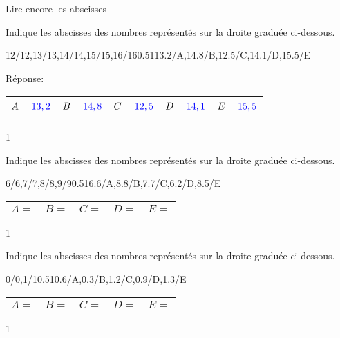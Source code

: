 \documentclass[a4paper,11pt]{report}
\begin{document}
\begin{resolu}{Lire encore les abscisses}{
Indique les abscisses des nombres représentés sur la droite graduée ci-dessous.
\vspace{-0.2cm}
\begin{center}
\begin{numberlined}{12}{16}{1}{0.2}{12/12,13/13,14/14,15/15,16/16}{0.5}{1}{13.2/A,14.8/B,12.5/C,14.1/D,15.5/E}
\end{numberlined}
\end{center}
\vspace{-0.5cm}
Réponse:
\begin{center}
\begin{tabular}{|p{2.5cm}|p{2.5cm}|p{2.5cm}|p{2.2cm}|p{2.5cm}|}\hline
& & & & \\
$A={\color{blue}13,2}$&$B={\color{blue}14,8}$&$C={\color{blue}12,5}$&$D={\color{blue}14,1}$&$E={\color{blue}15,5}$ \\
& & & & \\\hline
\end{tabular}
\end{center}
\vspace{-0.5cm}
}{1}
\end{resolu}

\begin{exop}{
Indique les abscisses des nombres représentés sur la droite graduée ci-dessous.
\vspace{-0.2cm}
\begin{center}
\begin{numberlined}{6}{9}{1}{0.1}{6/6,7/7,8/8,9/9}{0.5}{1}{6.6/A,8.8/B,7.7/C,6.2/D,8.5/E}
\end{numberlined}
\end{center}
\vspace{-0.5cm}
\renewcommand{\arraystretch}{1.5}
\begin{center}
\begin{tabular}{|p{2.5cm}|p{2.5cm}|p{2.5cm}|p{2.5cm}|p{2.5cm}|}\hline
$A=$&$B=$&$C=$&$D=$&$E=$ \\
\hline
\end{tabular}
\end{center}
}{1}\end{exop}






\begin{exop}{
Indique les abscisses des nombres représentés sur la droite graduée ci-dessous.
\vspace{-0.2cm}
\begin{center}
	\begin{numberlined}{0}{1.75}{1}{0.2}{0/0,1/1}{0.5}{1}{0.6/A,0.3/B,1.2/C,0.9/D,1.3/E}
\end{numberlined}
\end{center}
\begin{center}
\renewcommand{\arraystretch}{1.5}
\begin{tabular}{|p{2.5cm}|p{2.5cm}|p{2.5cm}|p{2.5cm}|p{2.5cm}|}\hline
$A=$&$B=$&$C=$&$D=$&$E=$ \\
\hline
\end{tabular}
\end{center}
}{1}\end{exop}
\end{document}
